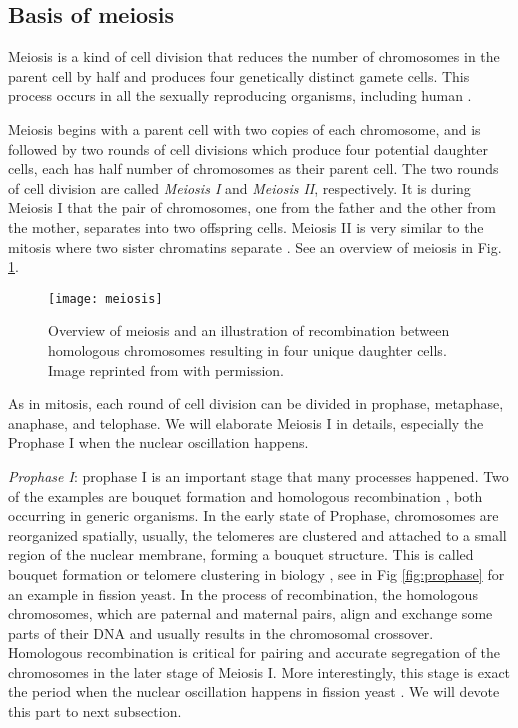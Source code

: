 \subsection{Basis of meiosis}
\label{sub:basis_of_meiosis}

Meiosis is a kind of cell division that reduces the number of chromosomes in the parent cell by half and produces four genetically distinct gamete cells. This process occurs in all the sexually reproducing organisms, including human \cite{Freeman2008}. 

Meiosis begins with a parent cell with two copies of each chromosome, and is followed by two rounds of cell divisions which produce four potential daughter cells, each has half number of chromosomes as their parent cell. The two rounds of cell division are called \emph{Meiosis I} and \emph{Meiosis II}, respectively. It is during Meiosis I that the pair of chromosomes, one from the father and the other from the mother, separates into two offspring cells. Meiosis II is very similar to the mitosis where two sister chromatins separate \cite{Freeman2008,Villeneuve2001a}. See an overview of meiosis in Fig. \ref{fig:meiosis}.

\begin{figure}[htpb]
    \centering
    \texttt{[image: meiosis]}
    \caption{Overview of meiosis and an illustration of recombination between homologous chromosomes resulting in four unique daughter cells. Image reprinted from \cite{} with permission.}
    \label{fig:meiosis}
\end{figure}

As in mitosis, each round of cell division can be divided in prophase, metaphase, anaphase, and telophase. We will elaborate Meiosis I in details, especially the Prophase I when the nuclear oscillation happens. 

\emph{Prophase I}: prophase I is an important stage that many processes happened. Two of the examples are bouquet formation \cite{Wegener1980a} and homologous recombination \cite{Davis2001,Gerton2005}, both occurring in generic organisms. In the early state of Prophase, chromosomes are reorganized spatially, usually, the telomeres are clustered and attached to a small region of the nuclear membrane, forming a bouquet structure. This is called bouquet formation or telomere clustering in biology \cite{Chikashige1994,Wegener1980a,Niwa2000}, see in Fig \ref{fig:prophase} for an example in fission yeast. In the process of recombination, the homologous chromosomes, which are paternal and maternal pairs, align and exchange some parts of their DNA and usually results in the chromosomal crossover. Homologous recombination is critical for pairing and accurate segregation of the chromosomes in the later stage of Meiosis I. More interestingly, this stage is exact the period when the nuclear oscillation happens in fission yeast \cite{Ding1998,Wells2006}. We will devote this part to next subsection.

